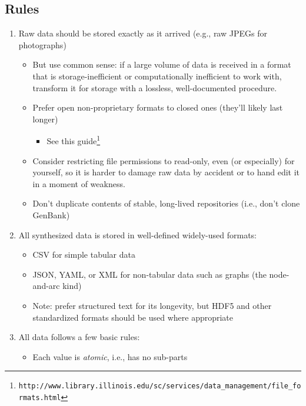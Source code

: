 \documentclass[10pt]{article}
\newcommand{\withurl}[2]{{#1}\footnote{\texttt{#2}}}
\begin{document}
\subsection*{Rules}

\begin{enumerate}
\item
  Raw data should be stored exactly as it arrived (e.g., raw JPEGs for
  photographs)

  \begin{itemize}
  \item
    But use common sense: if a large volume of data is received in a
    format that is storage-inefficient or computationally inefficient to
    work with, transform it for storage with a lossless, well-documented
    procedure.
  \item
    Prefer open non-proprietary formats to closed ones (they'll likely
    last longer)

    \begin{itemize}
      \item
      See \withurl{this
        guide}{http://www.library.illinois.edu/sc/services/data\_management/file\_formats.html}
    \end{itemize}
  \item
    Consider restricting file permissions to read-only, even (or
    especially) for yourself, so it is harder to damage raw data by
    accident or to hand edit it in a moment of weakness.
  \item
    Don't duplicate contents of stable, long-lived repositories (i.e.,
    don't clone GenBank)
  \end{itemize}
\item
  All synthesized data is stored in well-defined widely-used formats:

  \begin{itemize}
  \item
    CSV for simple tabular data
  \item
    JSON, YAML, or XML for non-tabular data such as graphs (the
    node-and-arc kind)
  \item
    Note: prefer structured text for its longevity, but HDF5 and other
    standardized formats should be used where appropriate
  \end{itemize}
\item
  All data follows a few basic rules:

  \begin{itemize}
  \item
    Each value is \emph{atomic}, i.e., has no sub-parts


\end{itemize}
\end{enumerate}
\end{document}
